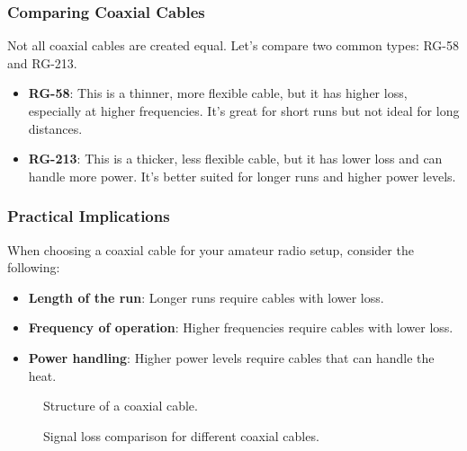 \subsubsection*{Comparing Coaxial Cables}
Not all coaxial cables are created equal. Let's compare two common types: RG-58 and RG-213.
\begin{itemize}[noitemsep]    \item \textbf{RG-58}: This is a thinner, more flexible cable, but it has higher loss, especially at higher frequencies. It's great for short runs but not ideal for long distances.
    \item \textbf{RG-213}: This is a thicker, less flexible cable, but it has lower loss and can handle more power. It's better suited for longer runs and higher power levels.
\end{itemize}

\subsubsection*{Practical Implications}
When choosing a coaxial cable for your amateur radio setup, consider the following:
\begin{itemize}[noitemsep]    \item \textbf{Length of the run}: Longer runs require cables with lower loss.
    \item \textbf{Frequency of operation}: Higher frequencies require cables with lower loss.
    \item \textbf{Power handling}: Higher power levels require cables that can handle the heat.
\end{itemize}

\begin{figure}[h!]
    \centering
    \caption{Structure of a coaxial cable.}
    \label{fig:coax-structure}
\end{figure}

\begin{figure}[h!]
    \centering
    \caption{Signal loss comparison for different coaxial cables.}
    \label{fig:coax-loss}
\end{figure}

